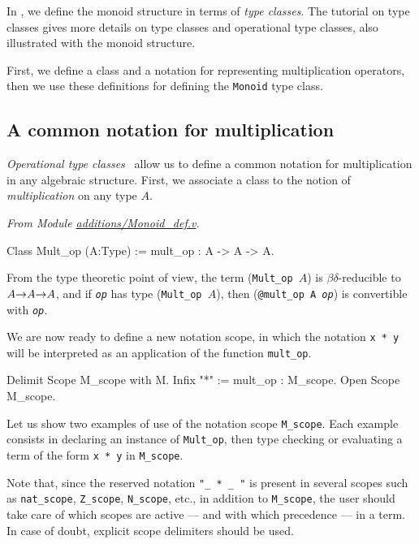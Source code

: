 In \coq{}, we define the monoid structure in terms of 
\emph{type classes}\cite{MS08,BS2011}. The tutorial on type classes \cite{PCMS} gives more details on type classes and
operational type classes, also illustrated with the monoid structure.


First, we define a class and a notation for representing multiplication operators, then we use
these definitions for defining the \texttt{Monoid} type class.

\subsection{A common notation for multiplication}
\label{op-classes}
\emph{Operational type classes}~\cite{BS2011}
allow us to define a common notation 
for multiplication in any algebraic structure. 
First, we associate a class to the notion of \emph{multiplication} 
on any type $A$.

\emph{From Module \href{../theories/html/hydras.additions.Monoid_def.html}{additions/Monoid\_def.v}.}

\begin{Coqsrc}
Class Mult_op (A:Type) := mult_op : A -> A -> A.  
\end{Coqsrc}

From the type theoretic point of view, the term (\texttt{Mult\_op $A$}) is 
$\beta\delta$-reducible to \texttt{$A\mbox{$\rightarrow$} A \mbox{$\rightarrow$} A$}, and
if \texttt{\it op} has type (\texttt{Mult\_op $A$}), then 
(\texttt{@mult\_op A {\it op}}) is convertible with \texttt{\it op}.

We are now ready to define a new notation scope, in which the notation
\texttt{x * y} will be interpreted as an application of the function
\texttt{mult\_op}.

\begin{Coqsrc}
Delimit Scope M_scope with M.
Infix "*" := mult_op : M_scope.
Open Scope M_scope.  
\end{Coqsrc}

 Let us show two examples of use of the
notation scope \texttt{M\_scope}. Each example consists in declaring an 
instance of \texttt{Mult\_op}, then type checking or evaluating
a term of the form \texttt{x * y} in \texttt{M\_scope}.

Note that, since the reserved notation \texttt{"\_ * \_ "} is 
present in several scopes such as  \texttt{nat\_scope}, \texttt{Z\_scope},
\texttt{N\_scope}, etc., in addition to  \texttt{M\_scope},  the user should
take care of which scopes are active --- and with  which precedence --- in a \gallina{} term.
In case of doubt, explicit scope delimiters should be used.
  




